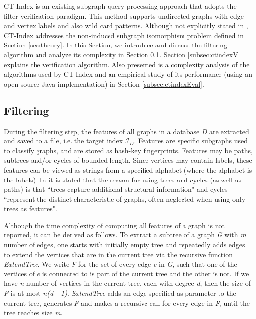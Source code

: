 \documentclass{l4proj}
\newcommand{\fancyI}{\mathcal{I}}
\begin{document}
CT-Index \cite{ctindex} is an existing subgraph query processing approach that adopts the filter-verification paradigm. This method supports undirected graphs with edge and vertex labels and also wild card patterns. Although not explicitly stated in \cite{ctindex}, CT-Index addresses the non-induced subgraph isomorphism problem defined in Section \ref{sec:theory}. In this Section, we introduce and discuss the filtering algorithm and analyze its complexity in Section \ref{subsec:ctindexF}. Section \ref{subsec:ctindexV} explains the verification algorithm. Also presented is a complexity analysis of the algorithms used by CT-Index and an empirical study of its performance (using an open-source Java implementation) in Section \ref{subsec:ctindexEval}.

\subsection{Filtering}
\label{subsec:ctindexF}
During the filtering step, the features of all graphs in a database \emph{D} are extracted and saved to a file, i.e. the target index $\fancyI_{D}$. Features are specific subgraphs used to classify graphs, and are stored as hash-key fingerprints. Features may be paths, subtrees and/or cycles of bounded length. Since vertices may contain labels, these features can be viewed as strings from a specified alphabet (where the alphabet is the labels). In \cite{ctindex} it is stated that the reason for using \glspl{tree} and cycles (as well as paths) is that ``trees capture additional structural information" and cycles ``represent the distinct characteristic of graphs, often neglected when using only trees as features".

Although the time complexity of computing all features of a graph is not reported, it can be derived as follows. To extract a subtree of a graph \emph{G} with \emph{m} number of edges, one starts with initially empty tree and repeatedly adds edges to extend the vertices that are in the current tree via the recursive function \emph{ExtendTree}. We write \emph{F} for the set of every edge \emph{e} in \emph{G}, such that one of the vertices of \emph{e} is connected to is part of the current tree and the other is not. If we have \emph{n} number of vertices in the current tree, each with degree \emph{d}, then the size of \emph{F} is at most \emph{n(d - 1)}. \emph{ExtendTree} adds an edge specified as parameter to the current tree, generates \emph{F} and makes a recursive call for every edge in \emph{F}, until the tree reaches size \emph{m}.
\end{document}
